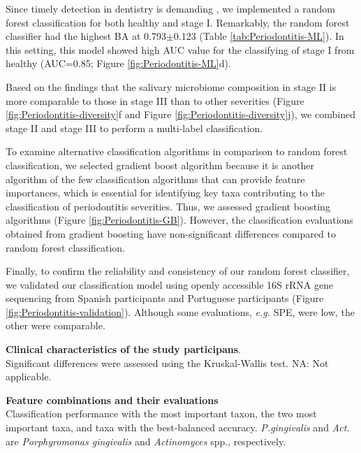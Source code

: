 \documentclass[11pt, a4paper, onecolumn, oneside]{report}
\begin{document}
                Since timely detection in dentistry is demanding \cite{Periodontitis-5}, we implemented a random forest classification for both healthy and stage I. Remarkably, the random forest classifier had the highest BA at 0.793$\pm$0.123 (Table \ref{tab:Periodontitis-ML}). In this setting, this model showed high AUC value for the classifying of stage I from healthy (AUC=0.85; Figure \ref{fig:Periodontitis-ML}d).

                Based on the findings that the salivary microbiome composition in stage II is more comparable to those in stage III than to other severities (Figure \ref{fig:Periodontitis-diversity}f and Figure \ref{fig:Periodontitis-diversity}j), we combined stage II and stage III to perform a multi-label classification.

                To examine alternative classification algorithms in comparison to random forest classification, we selected gradient boost algorithm because it is another algorithm of the few classification algorithms that can provide feature importances, which is essential for identifying key taxa contributing to the classification of periodontitis severities. Thus, we assessed gradient boosting algorithms (Figure \ref{fig:Periodontitis-GB}). However, the classification evaluations obtained from gradient boosting have non-significant differences compared to random forest classification.

                Finally, to confirm the reliability and consistency of our random forest classifier, we validated our classification model using openly accessible 16S rRNA gene sequencing from Spanish participants \cite{Periodontitis-10} and Portuguese participants \cite{Periodontitis-Portuguese-1} (Figure \ref{fig:Periodontitis-validation}). Although some evaluations, \textit{e.g.} SPE, were low, the other were comparable.

            \begin{table}[p]
                \centering
                \caption[Clinical characteristics of the study participants]{\textbf{Clinical characteristics of the study participans}. \\
                    Significant differences were assessed using the Kruskal-Wallis test. NA: Not applicable.}
                
                \label{tab:Periodontitis-clinical}
            \end{table}
            \clearpage

            \begin{table}
                \centering
                \caption[Feature combinations and their evaluations]{\textbf{Feature combinations and their evaluations} \\
                    Classification performance with the most important taxon, the two most important taxa, and taxa with the best-balanced accuracy. \textit{P.gingivalis} and \textit{Act.} are \textit{Porphyromonas gingivalis} and \textit{Actinomyces} spp., respectively.}
                    \small\setlength{\tabcolsep}{1 pt}
                    
                \label{tab:Periodontitis-ML}
            \end{table}
            \clearpage
\end{document}
